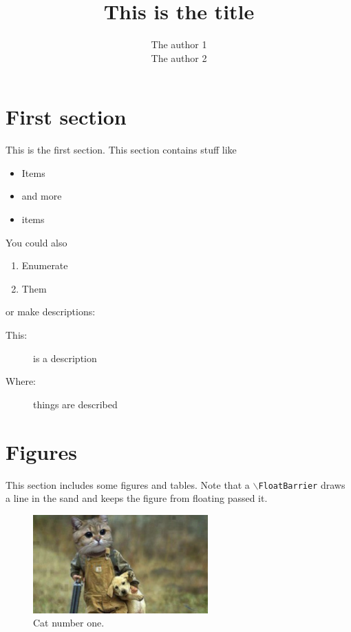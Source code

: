 \documentclass{article}
\author{The author 1\\The author 2}
\title{This is the title}
\begin{document}
\maketitle

\tableofcontents
\newpage


\section{First section}
\label{sec:first-section}

This is the first section. This section contains stuff like

\begin{itemize}
\item Items
\item and more
\item items
\end{itemize}

You could also

\begin{enumerate}
\item Enumerate
\item Them
\end{enumerate}

or make descriptions:
\begin{description}
\item[This:] is a description
\item[Where:] things are described
\end{description}

\section{Figures}
\label{sec:figures}

This section includes some figures and tables. Note that a
\texttt{$\backslash$FloatBarrier} draws a line in the sand
and keeps the figure from floating passed it.

\begin{figure}
  \centering
  \includegraphics[width=0.6\textwidth]{graphics/cat1}
  \caption{Cat number one.}
  \label{fig:cat1}
\end{figure}
\end{document}
